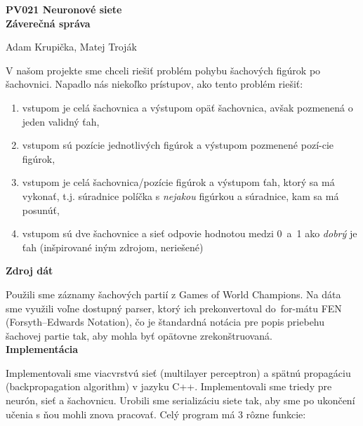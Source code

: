 \documentclass[12pt]{article}
\newcommand{\mysection}[1]{{\newpage\centering\Large\textbf{#1}\\}\normalsize\vspace{0.1cm}}
\newcommand{\mysmallsection}[1]{\vspace{0.5cm}{\centering\large\textbf{#1}\\}\normalsize\vspace{0.5cm}}
\begin{document}
\mysection{PV021 Neuronové siete \\ Záverečná správa}
\begin{center}
Adam Krupička, Matej Troják
\end{center}

\mysmallsection{Problém šachového ťahu}
V našom projekte sme chceli riešiť problém pohybu šachových figúrok po šachovnici. Napadlo nás niekoľko prístupov, ako tento problém riešiť:

\begin{enumerate}
\item vstupom je celá šachovnica a výstupom opäť šachovnica, avšak pozmenená o jeden validný ťah,
\item vstupom sú pozície jednotlivých figúrok a výstupom pozmenené pozí-cie figúrok,
\item vstupom je celá šachovnica/pozície figúrok a výstupom ťah, ktorý sa má vykonať, t.j. súradnice políčka s \textit{nejakou} figúrkou a súradnice, kam sa má posunúť,
\item vstupom sú dve šachovnice a sieť odpovie hodnotou medzi 0~a~1 ako \textit{dobrý} je ťah (inšpirované iným zdrojom, neriešené)
\end{enumerate}

{\centering\textbf{Zdroj dát}\\}

Použili sme záznamy šachových partií z Games of World Champions\footnotemark[1]. Na dáta sme využili voľne dostupný parser, ktorý ich prekonvertoval do~for-mátu FEN (Forsyth–Edwards Notation), čo je štandardná notácia pre popis priebehu šachovej partie tak, aby mohla byť opätovne zrekonštruovaná. \\

{\centering\textbf{Implementácia}\\}

Implementovali sme viacvrstvú sieť (multilayer perceptron) a spätnú propagáciu (backpropagation algorithm) v jazyku C++. Implementovali sme triedy pre neurón, sieť a šachovnicu. Urobili sme serializáciu siete tak, aby sme po ukončení učenia s ňou mohli znova pracovať. Celý program má 3 rôzne funkcie:
\end{document}
